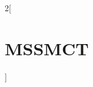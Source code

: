 \documentclass[11pt,twoside]{article}
\begin{document}
\begin{landscape}

\begin{minipage}{25cm}

\begin{large}
\begin{multicols}{2}[\section*{MSSMCT}]
\end{multicols}
\end{large}

\end{minipage}

\clearpage

\renewcommand{\arraystretch}{1.5}


\end{landscape}
\end{document}
